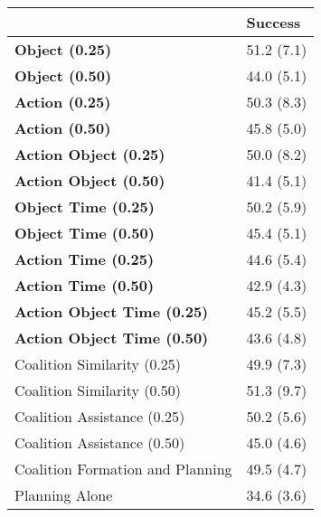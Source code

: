 \begin{tabular}{ll}
\hline
                                    & Success    \\
\hline
 \textbf{Object (0.25)}             & 51.2 (7.1) \\
 \textbf{Object (0.50)}             & 44.0 (5.1) \\
 \textbf{Action (0.25)}             & 50.3 (8.3) \\
 \textbf{Action (0.50)}             & 45.8 (5.0) \\
 \textbf{Action Object (0.25)}      & 50.0 (8.2) \\
 \textbf{Action Object (0.50)}      & 41.4 (5.1) \\
 \textbf{Object Time (0.25)}        & 50.2 (5.9) \\
 \textbf{Object Time (0.50)}        & 45.4 (5.1) \\
 \textbf{Action Time (0.25)}        & 44.6 (5.4) \\
 \textbf{Action Time (0.50)}        & 42.9 (4.3) \\
 \textbf{Action Object Time (0.25)} & 45.2 (5.5) \\
 \textbf{Action Object Time (0.50)} & 43.6 (4.8) \\
 Coalition Similarity (0.25)        & 49.9 (7.3) \\
 Coalition Similarity (0.50)        & 51.3 (9.7) \\
 Coalition Assistance (0.25)        & 50.2 (5.6) \\
 Coalition Assistance (0.50)        & 45.0 (4.6) \\
 Coalition Formation and Planning   & 49.5 (4.7) \\
 Planning Alone                     & 34.6 (3.6) \\
\hline
\end{tabular}
